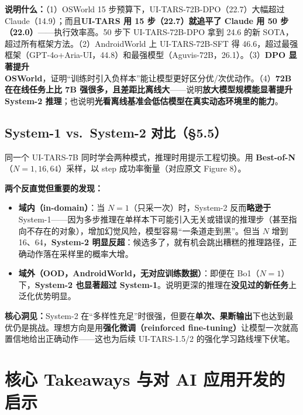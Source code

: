\documentclass[11pt,UTF8,fontset=fandol]{ctexart}
\begin{document}
\textbf{说明什么：}（1）OSWorld 15 步预算下，UI-TARS-72B-DPO（22.7）大幅超过 Claude（14.9）；而且\textbf{UI-TARS 用 15 步（22.7）就追平了 Claude 用 50 步（22.0）}——执行效率高。50 步下 UI-TARS-72B-DPO 拿到 24.6 的新 SOTA，超过所有框架方法。（2）AndroidWorld 上 UI-TARS-72B-SFT 得 46.6，超过最强框架（GPT-4o+Aria-UI，44.8）和最强模型（Aguvis-72B，26.1）。（3）\textbf{DPO 显著提升 OSWorld}，证明“训练时引入负样本”能让模型更好区分优/次优动作。（4）\textbf{72B 在在线任务上比 7B 强很多，且差距比离线大}——说明\textbf{放大模型规模能显著提升 System-2 推理}；也说明\textbf{光看离线基准会低估模型在真实动态环境里的能力}。

\subsection{System-1 vs.\ System-2 对比（§5.5）}

同一个 UI-TARS-7B 同时学会两种模式，推理时用提示工程切换。用 \textbf{Best-of-N}（$N=1,16,64$）采样，以 step 成功率衡量（对应原文 Figure 8）。

\textbf{两个反直觉但重要的发现：}
\begin{itemize}[leftmargin=1.5em]
\item \textbf{域内（in-domain）}：当 $N=1$（只采一次）时，System-2 反而\textbf{略逊于} System-1——因为多步推理在单样本下可能引入无关或错误的推理步（甚至指向不存在的对象），增加幻觉风险，模型容易“一条道走到黑”。但当 $N$ 增到 16、64，\textbf{System-2 明显反超}：候选多了，就有机会跳出糟糕的推理路径，正确动作落在采样里的概率大增。
\item \textbf{域外（OOD，AndroidWorld，无对应训练数据）}：即便在 Bo1（$N=1$）下，\textbf{System-2 也显著超过 System-1}。说明更深的推理在\textbf{没见过的新任务}上泛化优势明显。
\end{itemize}

\textbf{核心洞见：}System-2 在“多样性充足”时很强，但要在\textbf{单次、果断输出}下也达到最优仍是挑战。理想方向是用\textbf{强化微调（reinforced fine-tuning）}让模型一次就高置信地给出正确动作——这也为后续 UI-TARS-1.5/2 的强化学习路线埋下伏笔。

\section{核心 Takeaways 与对 AI 应用开发的启示}
\end{document}
